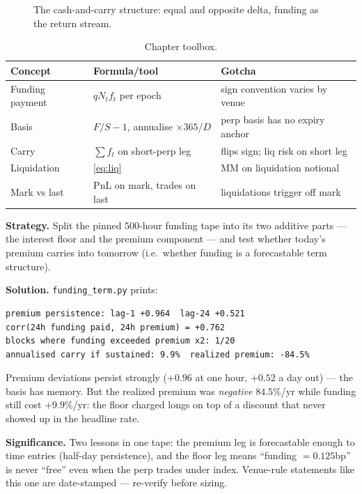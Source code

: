\begin{figure}[htbp]\centering

\caption{The cash-and-carry structure: equal and opposite delta, funding as the return stream.}
\label{fig:carrystack}
\end{figure}

\begin{table}[htbp]\centering\small
\caption{Chapter toolbox.}
\begin{tabular}{@{}lll@{}}
\toprule
Concept & Formula/tool & Gotcha\\
\midrule
Funding payment & $qN_t f_t$ per epoch & sign convention varies by venue\\
Basis & $F/S-1$, annualise $\times365/D$ & perp basis has no expiry anchor\\
Carry & $\sum f_t$ on short-perp leg & flips sign; liq risk on short leg\\
Liquidation & \eqref{eq:liq} & MM on liquidation notional\\
Mark vs last & PnL on mark, trades on last & liquidations trigger off mark\\
\bottomrule
\end{tabular}
\end{table}

\begin{example}\label{ex:fundterm}
\textbf{Strategy.} Split the pinned 500-hour funding tape into
its two additive parts --- the interest floor and the premium
component --- and test whether today's premium carries into
tomorrow (i.e.\ whether funding is a forecastable term structure).

\textbf{Solution.} \texttt{funding\_term.py} prints:
\begin{verbatim}
premium persistence: lag-1 +0.964  lag-24 +0.521
corr(24h funding paid, 24h premium) = +0.762
blocks where funding exceeded premium x2: 1/20
annualised carry if sustained: 9.9%  realized premium: -84.5%
\end{verbatim}
Premium deviations persist strongly ($+0.96$ at one hour, $+0.52$
a day out) --- the basis has memory. But the realized premium was
\emph{negative} $84.5\%$/yr while funding still cost $+9.9\%$/yr:
the floor charged longs on top of a discount that never showed up
in the headline rate.

\textbf{Significance.} Two lessons in one tape: the premium leg
is forecastable enough to time entries (half-day persistence), and
the floor leg means ``funding $=0.125$bp'' is never ``free'' even
when the perp trades under index. Venue-rule statements like this
one are date-stamped --- re-verify before sizing.
\end{example}

